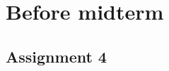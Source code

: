 \documentclass[document]{article}
\begin{document}
\title{\textsc{}}
\maketitle
\tableofcontents

\newtheorem{theorem}{Theorem}
\newtheorem{assumption}{Assumption}
\newtheorem{definition}{Definition}
\newtheorem{remark}{Remark}
\newtheorem{outcome}{Outcome}
\newtheorem{proposition}{Proposition}
\newtheorem{problem}{Problem}

\section{Before midterm}
\subsection{Assignment 4}
\end{document}
